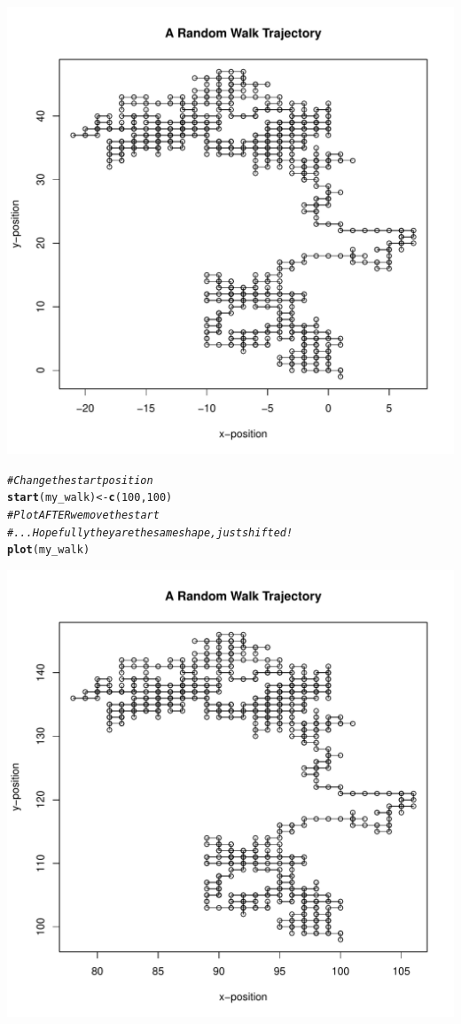 \documentclass{article}\usepackage[]{graphicx}\usepackage[]{color}
\makeatletter
\def\maxwidth{ %
  \ifdim\Gin@nat@width>\linewidth
    \linewidth
  \else
    \Gin@nat@width
  \fi
}
\newcommand{\hlnum}[1]{\textcolor[rgb]{0.686,0.059,0.569}{#1}}%
\newcommand{\hlcom}[1]{\textcolor[rgb]{0.678,0.584,0.686}{\textit{#1}}}%
\newcommand{\hlstd}[1]{\textcolor[rgb]{0.345,0.345,0.345}{#1}}%
\newcommand{\hlkwb}[1]{\textcolor[rgb]{0.69,0.353,0.396}{#1}}%
\newcommand{\hlkwd}[1]{\textcolor[rgb]{0.737,0.353,0.396}{\textbf{#1}}}%
\newenvironment{kframe}{%
 \def\at@end@of@kframe{}%
 \ifinner\ifhmode%
  \def\at@end@of@kframe{\end{minipage}}%
  \begin{minipage}{\columnwidth}%
 \fi\fi%
 \def\FrameCommand##1{\hskip\@totalleftmargin \hskip-\fboxsep
 \colorbox{shadecolor}{##1}\hskip-\fboxsep
     \hskip-\linewidth \hskip-\@totalleftmargin \hskip\columnwidth}%
 \MakeFramed {\advance\hsize-\width
   \@totalleftmargin\z@ \linewidth\hsize
   \@setminipage}}%
 {\par\unskip\endMakeFramed%
 \at@end@of@kframe}
\newenvironment{knitrout}{}{} %
\makeatother
\begin{document}
\begin{knitrout}
\includegraphics[width=\maxwidth]{figure/external-code-1-1} 
\begin{kframe}\begin{alltt}
\hlcom{# Change the start position}
\hlkwd{start}\hlstd{(my_walk)}\hlkwb{<-}\hlkwd{c}\hlstd{(}\hlnum{100}\hlstd{,}\hlnum{100}\hlstd{)}
\hlcom{# Plot AFTER we move the start}
\hlcom{# ...Hopefully they are the same shape, just shifted!}
\hlkwd{plot}\hlstd{(my_walk)}
\end{alltt}
\end{kframe}
\includegraphics[width=\maxwidth]{figure/external-code-1-2} 

\end{knitrout}
\end{document}
